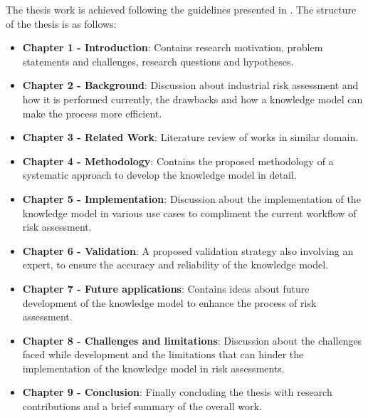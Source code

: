 The thesis work is achieved following the guidelines presented in \cite{10.5555/2742708}. The structure of the thesis is as follows:
\begin{itemize}
	\item \textbf{Chapter 1 - Introduction}: Contains research motivation, problem statements and challenges, research questions and hypotheses.
 	\item \textbf{Chapter 2 - Background}: Discussion about industrial risk assessment and how it is performed currently, the drawbacks and how a knowledge model can make the process more efficient.
  	\item \textbf{Chapter 3 - Related Work}: Literature review of works in similar domain.
   	\item \textbf{Chapter 4 - Methodology}: Contains the proposed methodology of a systematic approach to develop the knowledge model in detail.
	\item \textbf{Chapter 5 - Implementation}: Discussion about the implementation of the knowledge model in various use cases to compliment the current workflow of risk assessment.
        \item \textbf{Chapter 6 - Validation}: A proposed validation strategy also involving an expert, to ensure the accuracy and reliability of the knowledge model.
 	\item \textbf{Chapter 7 - Future applications}: Contains ideas about future development of the knowledge model to enhance the process of risk assessment.
  	\item \textbf{Chapter 8 - Challenges and limitations}: Discussion about the challenges faced while development and the limitations that can hinder the implementation of the knowledge model in risk assessments.
        \item \textbf{Chapter 9 - Conclusion}: Finally concluding the thesis with research contributions and a brief summary of the overall work.
 \end{itemize}